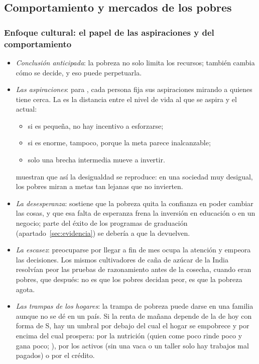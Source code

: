 \documentclass[11pt]{article}
\begin{document}
\subsection{Comportamiento y mercados de los pobres}\label{sec:micro}

\subsubsection{Enfoque cultural: el papel de las aspiraciones y del comportamiento}\label{sec:cultural}

\begin{itemize}
\item \emph{Conclusión anticipada}: la pobreza no solo limita los recursos; también cambia cómo se decide, y eso puede perpetuarla.
\item \emph{Las aspiraciones}: para \textcite{Ray2006}, cada persona fija sus aspiraciones mirando a quienes tiene cerca. La  es la distancia entre el nivel de vida al que se aspira y el actual:
  \begin{itemize}
  \item si es pequeña, no hay incentivo a esforzarse;
  \item si es enorme, tampoco, porque la meta parece inalcanzable;
  \item solo una brecha intermedia mueve a invertir.
  \end{itemize}
  \textcite{GenicotRay2017} muestran que así la desigualdad se reproduce: en una sociedad muy desigual, los pobres miran a metas tan lejanas que no invierten.
\item \emph{La desesperanza}: \textcite{Duflo2012Tanner} sostiene que la pobreza quita la confianza en poder cambiar las cosas, y que esa falta de esperanza frena la inversión en educación o en un negocio; parte del éxito de los programas de graduación (apartado~\ref{sec:evidencia}) se debería a que la devuelven.
\item \emph{La escasez}: preocuparse por llegar a fin de mes ocupa la atención y empeora las decisiones. Los mismos cultivadores de caña de azúcar de la India resolvían peor las pruebas de razonamiento antes de la cosecha, cuando eran pobres, que después\nocite{ManiEtAl2013}: no es que los pobres decidan peor, es que la pobreza agota\nocite{MullainathanShafir2013}.
\item \emph{Las trampas de los hogares}: la trampa de pobreza puede darse en una familia aunque no se dé en un país. Si la renta de mañana depende de la de hoy con forma de S, hay un umbral por debajo del cual el hogar se empobrece y por encima del cual prospera\nocite{BanerjeeDuflo2011}: por la nutrición (quien come poco rinde poco y gana poco; \cite{DasguptaRay1986}), por los activos (sin una vaca o un taller solo hay trabajos mal pagados) o por el crédito.

\end{itemize}
\end{document}
